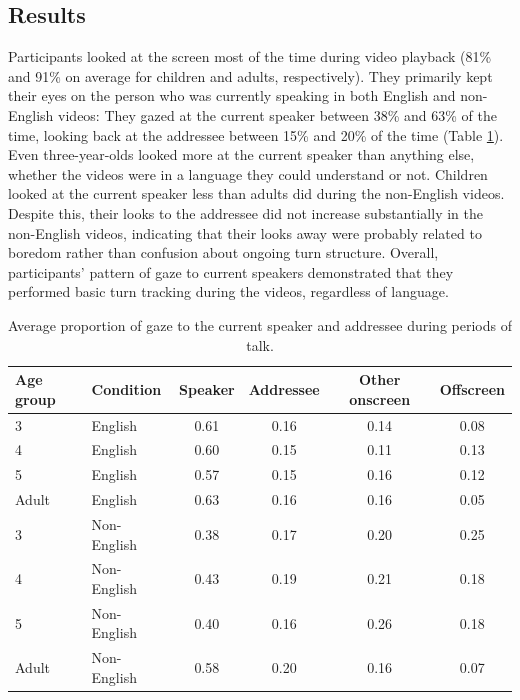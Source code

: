\documentclass[authoryear, 12pt]{elsarticle}
\begin{document}
\subsection{Results}
\label{sec:results1}

Participants looked at the screen most of the time during video playback (81\% and 91\% on average for children and adults, respectively). They primarily kept their eyes on the person who was currently speaking in both English and non-English videos: They gazed at the current speaker between 38\% and 63\% of the time, looking back at the addressee between 15\% and 20\% of the time (Table \ref{tab:e1_look}). Even three-year-olds looked more at the current speaker than anything else, whether the videos were in a language they could understand or not. Children looked at the current speaker less than adults did during the non-English videos. Despite this, their looks to the addressee did not increase substantially in the non-English videos, indicating that their looks away were probably related to boredom rather than confusion about ongoing turn structure. Overall, participants' pattern of gaze to current speakers demonstrated that they performed basic turn tracking during the videos, regardless of language.

\begin{table}[t]
\begin{center}
  \begin{tabular}{llcccc}
    \hline
    Age group & Condition & Speaker & Addressee & Other onscreen & Offscreen\\ 
    \hline
    3 & English & 0.61 & 0.16 & 0.14 & 0.08 \\ 
    4 & English & 0.60 & 0.15 & 0.11 & 0.13 \\ 
    5 & English & 0.57 & 0.15 & 0.16 & 0.12 \\ 
    Adult & English & 0.63 & 0.16 & 0.16 & 0.05 \\ 
    3 & Non-English & 0.38 & 0.17 & 0.20 & 0.25 \\ 
    4 & Non-English & 0.43 & 0.19 & 0.21 & 0.18 \\ 
    5 & Non-English & 0.40 & 0.16 & 0.26 & 0.18 \\ 
    Adult & Non-English & 0.58 & 0.20 & 0.16 & 0.07 \\ 
    \hline
  \end{tabular}
\end{center}
  \caption{Average proportion of gaze to the current speaker and addressee during periods of talk.}
\label{tab:e1_look}
\end{table}
\end{document}
